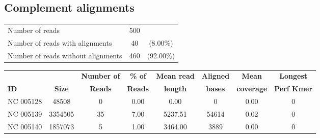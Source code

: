 \documentclass[a4paper,11pt,oneside]{article}
\begin{document}
\subsection*{Complement alignments}
\vspace{-3mm}
\begin{table}[H]
{\footnotesize
\fontsize{9pt}{11pt}\selectfont
\begin{tabular}{l c c}
Number of reads & 500 & \\
Number of reads with alignments & 40 & (8.00\%) \\
Number of reads without alignments & 460 & (92.00\%) \\
\end{tabular}
}
\end{table}
\vspace{-10mm}
\begin{table}[H]
{\footnotesize
\fontsize{9pt}{11pt}\selectfont
\begin{tabular}{l c c c c c c c}
          &             & {\bf Number of} & {\bf \% of} & {\bf Mean read} & {\bf Aligned} & {\bf Mean} & {\bf Longest} \\
{\bf ID} & {\bf Size} & {\bf Reads}     & {\bf Reads}  & {\bf length}    & {\bf bases}   & {\bf coverage} & {\bf Perf Kmer} \\
NC 005128 & 48508 & 0 & 0.00 & 0.00 & 0 & 0.00 & 0 \\
NC 005139 & 3354505 & 35 & 7.00 & 5237.51 & 54614 & 0.02 & 0 \\
NC 005140 & 1857073 & 5 & 1.00 & 3464.00 & 3889 & 0.00 & 0 \\
\end{tabular}
}
\end{table}
\end{document}
